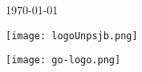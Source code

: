 \begin{titlepage}


    {\large \today}\\[1cm] %


    \begin{minipage}[l]{0.5\textwidth}
        \begin{flushleft}
            \texttt{[image: logoUnpsjb.png]}\\[0.5cm] %
            \linespread{4}
            \end{flushleft}
    \end{minipage}
    \begin{minipage}[l]{0.4\textwidth}
        \begin{flushright}
            \texttt{[image: go-logo.png]}\\[0.5cm] %
            \linespread{4}
        \end{flushright}
    \end{minipage}\\[1.5cm]
     


\end{titlepage}

